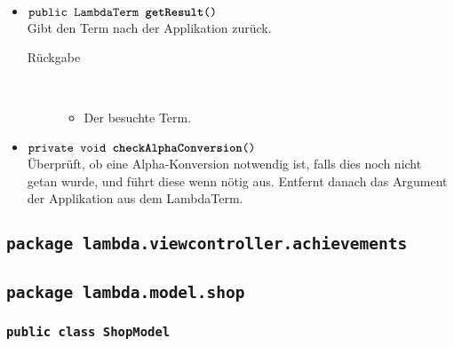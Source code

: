 \begin{description}
\begin{itemize}
		\item $\texttt{public LambdaTerm \textbf{getResult}()}$ \\ Gibt den Term nach der Applikation zurück.
		\begin{description}
			\item[Rückgabe] \hfill \\
			\vspace{-.8cm}
			\begin{itemize}
				\item Der besuchte Term.
			\end{itemize}
		\end{description}
		
		\item $\texttt{private void \textbf{checkAlphaConversion}()}$ \\ Überprüft, ob eine Alpha-Konversion notwendig ist, falls dies noch nicht getan wurde, und führt diese wenn nötig aus. Entfernt danach das Argument der Applikation aus dem LambdaTerm.
	\end{itemize}
\end{description}

\subsection{\texttt{package lambda.viewcontroller.achievements}}





\subsection{\texttt{package lambda.model.shop}}

\subsubsection{\normalfont \texttt{public class \textbf{ShopModel}}}


